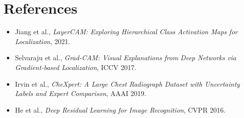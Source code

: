 \documentclass[12pt]{article}
\begin{document}
\section*{References}

\begin{itemize}[leftmargin=*]
    \item Jiang et al., \textit{LayerCAM: Exploring Hierarchical Class Activation Maps for Localization}, 2021.
    \item Selvaraju et al., \textit{Grad-CAM: Visual Explanations from Deep Networks via Gradient-based Localization}, ICCV 2017.
    \item Irvin et al., \textit{CheXpert: A Large Chest Radiograph Dataset with Uncertainty Labels and Expert Comparison}, AAAI 2019.
    \item He et al., \textit{Deep Residual Learning for Image Recognition}, CVPR 2016.
\end{itemize}
\end{document}
